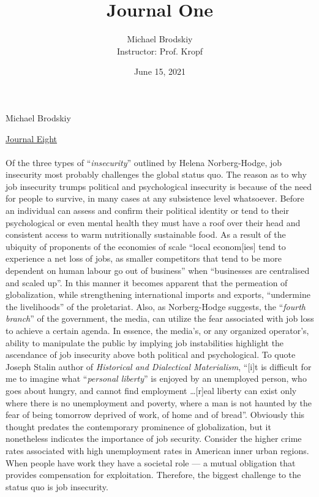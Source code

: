 \documentclass[12pt]{article}
\title{Journal One}
\date{June 15, 2021}
\author{Michael Brodskiy\\ \small Instructor: Prof. Kropf}
\begin{document}
\flushleft Michael Brodskiy

\begin{center}

 \underline{Journal Eight}

\end{center}

\begin{justify}
  \paragraph{} Of the three types of “\emph{insecurity}” outlined by Helena Norberg-Hodge, job insecurity most probably challenges the global status quo. The reason as to why job insecurity trumps political and psychological insecurity is because of the need for people to survive, in many cases at any subsistence level whatsoever. Before an individual can assess and confirm their political identity or tend to their psychological or even mental health they must have a roof over their head and consistent access to warm nutritionally sustainable food. As a result of the ubiquity of proponents of the economies of scale “local econom[ies] tend to experience a net loss of jobs, as smaller competitors that tend to be more dependent on human labour go out of business” when “businesses are centralised and scaled up”. In this manner it becomes apparent that the permeation of globalization, while strengthening international imports and exports, “undermine the livelihoods” of the proletariat. Also, as Norberg-Hodge suggests, the “\emph{fourth branch}” of the government, the media, can utilize the fear associated with job loss to achieve a certain agenda. In essence, the media's, or any organized operator's, ability to manipulate the public by implying job instabilities highlight the ascendance of job insecurity above both political and psychological. To quote Joseph Stalin author of \emph{Historical and Dialectical Materialism}, “[i]t is difficult for me to imagine what “\emph{personal liberty}” is enjoyed by an unemployed person, who goes about hungry, and cannot find employment \dots [r]eal liberty can exist only where there is no unemployment and poverty, where a man is not haunted by the fear of being tomorrow deprived of work, of home and of bread”. Obviously this thought predates the contemporary prominence of globalization, but it nonetheless indicates the importance of job security. Consider the higher crime rates associated with high unemployment rates in American inner urban regions. When people have work they have a societal role — a mutual obligation that provides compensation for exploitation. Therefore, the biggest challenge to the status quo is job insecurity.
\end{justify}
\end{document}
